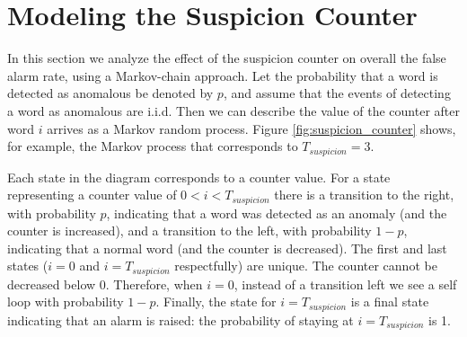 \documentclass[compsoc,conference,a4paper,10pt,times]{IEEEtran}
\newcommand{\level}[1]{\section{#1}}
\newcommand{\level}[1]{\chapter{#1}}
\begin{document}
\level{Modeling the Suspicion Counter} \label{ModelingSuspicionCounter}
  In this section we analyze the effect of the suspicion counter on overall the false alarm rate, using a Markov-chain approach. Let the probability that a word is detected as anomalous be denoted by $p$, and assume that the events of detecting a word as anomalous are i.i.d. 
  Then we can describe the value of the counter after word $i$ arrives as a Markov random process. 
  Figure \ref{fig:suspicion_counter} shows, for example, the Markov process that corresponds to $T_{suspicion} = 3$.
  
  Each state in the diagram corresponds to a counter value. For a state representing a counter value of $0 < i < T_{suspicion}$ there is a transition to the right, with probability $p$, indicating that a word was detected as an anomaly (and the counter is increased), and a transition to the left, with probability $1-p$, indicating that a normal word (and the counter is decreased). 
  The first and last states ($i = 0$ and $i = T_{suspicion}$ respectfully) are unique. The counter cannot be decreased below 0. Therefore, when $i = 0$, instead of a transition left we see a self loop with probability $1 - p$. Finally, the state for $i = T_{suspicion}$ is a final state indicating that an alarm is raised: the probability of staying at $i = T_{suspicion}$ is 1. 
  
\end{document}
